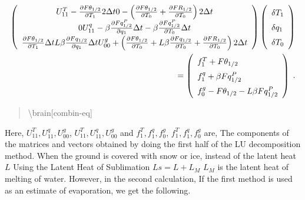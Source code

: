 \begin{eqnarray}
  \renewcommand{\arraystretch}{1.5}
  \left( \begin{array}{ccc}
      U_{11}^T - \frac{\partial F\theta_{1/2}}{\partial T_1} 2 \Delta t 
      0 
      - \left( \frac{\partial F\theta_{1/2}}{\partial T_0} 
                         + \frac{\partial FR_{1/2}}{\partial T_0}\right) 2 \Delta t \\
      0 
      U_{11}^q - \beta \frac{\partial Fq^P_{1/2}}{\partial q_1} \Delta t 
      - \beta \frac{\partial Fq^P_{1/2}}{\partial T_0} \Delta t \\
        \frac{\partial F\theta_{1/2}}{\partial T_1} \Delta t 
      L \beta \frac{\partial Fq_{1/2}}{\partial q_1} \Delta t 
      U_{00}^g + \left(\frac{\partial F\theta_{1/2}}{\partial T_0}
                + L \beta \frac{\partial Fq_{1/2}}{\partial T_0}
                + \frac{\partial FR_{1/2}}{\partial T_0} \right) 2 \Delta t \\
  \end{array} \right)
  \left( \begin{array}{l}
      \delta T_1 \\ \delta q_1 \\ \delta T_0 \\
  \end{array} \right)   \\
=  \left( \begin{array}{l}
      f_1^T + F\theta_{1/2} \\  
      f_1^q + \beta Fq^P_{1/2} \\  
      f_0^g - F\theta_{1/2} - L \beta Fq^P_{1/2} \\  
  \end{array} \right) \; .
\end{eqnarray}

\begin{quote}
\protect\hypertarget{combin-eq}{}{\textbackslash brain{[}combin-eq{]}}
\end{quote}

Here, \(U_{11}^T, U_{11}^q, U_{00}^g\), \(U_{11}^T, U_{11}^q, U_{00}^g\)
and \(f_1^T, f_1^q, f_0^g\), \(f_1^T, f_1^q, f_0^g\) are, The components
of the matrices and vectors obtained by doing the first half of the LU
decomposition method. When the ground is covered with snow or ice,
instead of the latent heat \(L\) Using the Latent Heat of Sublimation
\(Ls = L + L_M\) \(L_M\) is the latent heat of melting of water.
However, in the second calculation, If the first method is used as an
estimate of evaporation, we get the following.

